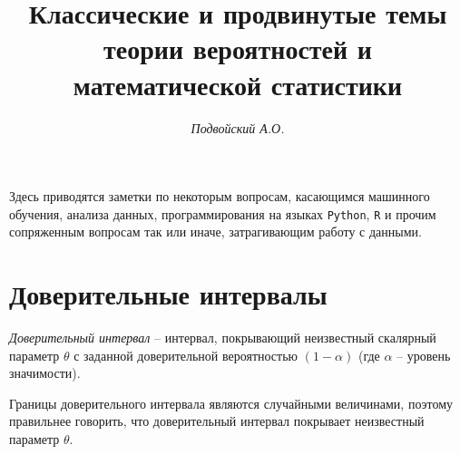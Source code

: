 \documentclass[%
	11pt,
	a4paper,
	utf8,
		]{article}
\begin{document}
\title{Классические и продвинутые темы теории вероятностей и математической статистики}

\author{\itshape Подвойский А.О.}

\date{}
\maketitle

\thispagestyle{fancy}

Здесь приводятся заметки по некоторым вопросам, касающимся машинного обучения, анализа данных, программирования на языках \texttt{Python}, \texttt{R} и прочим сопряженным вопросам так или иначе, затрагивающим работу с данными.




\tableofcontents

\section{Доверительные интервалы}

\emph{Доверительный интервал} -- интервал, покрывающий неизвестный скалярный параметр $ \theta $ с заданной доверительной вероятностью $ (1 - \alpha) $ (где $ \alpha $ -- уровень значимости).

Границы доверительного интервала являются случайными величинами, поэтому правильнее говорить, что доверительный интервал покрывает неизвестный параметр $ \theta $.



\begin{thebibliography}{99}
\end{thebibliography}
\end{document}
